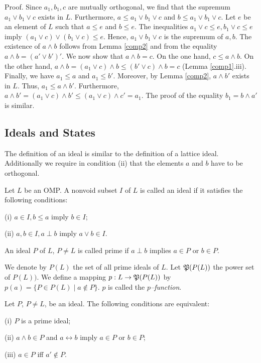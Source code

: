 Proof.
Since $a_1,b_1,c$ are mutually orthogonal, we find that the
supremum $a_1 \vee b_1 \vee c$ exists in $L$.
Furthermore, $a \le a_1 \vee b_1 \vee c$ and $b \le a_1 \vee b_1 \vee
c$. Let $e$ be an element of $L$ such that $a \le e$ and $b \le e$.
The inequalities $a_1 \vee c \le e, b_1 \vee c\le e$ imply
$(a_1 \vee c) \vee (b_1 \vee c) \le e$.
Hence, $a_1 \vee b_1 \vee c$ is the supremum of $a,b$.
The existence of $a \wedge b$ follows from
Lemma \ref{comp2} and from the equality
$a \wedge b = (a' \vee b')'$.
We now show that $a \wedge b = c$.
On the one hand, $c \le a \wedge b$.
On the other hand, $a \wedge b = (a_1 \vee c) \wedge b \le
(b' \vee c) \wedge b = c$ (Lemma \ref{comp1}.iii).
Finally, we have $a_1 \le a$ and $a_1 \le b'$.
Moreover, by Lemma \ref{comp2}, $a \wedge b'$ exists in $L$.
Thus, $a_1 \le a \wedge b'$.
Furthermore, $a \wedge b' = (a_1 \vee c) \wedge b' \le
(a_1 \vee c) \wedge c' = a_1$.
The proof of the equality $b_1 = b \wedge a'$ is similar.



\subsection{Ideals and States}

The definition of an ideal is similar to the definition of a
lattice ideal.
Additionally we require in condition (ii) that the elements $a$ and $b$
have to be orthogonal.

\begin{defin}
\label{ideal}
Let $L$ be an OMP. A nonvoid subset $I$ of $L$ is called an ideal if it
satisfies the following conditions:

(i) $a \in I, b \le a$ imply $b \in I$;

(ii) $a,b \in  I, a \perp b$ imply $a \vee b \in I$.
\end{defin}

\begin{defin}
\label{primeideal}
An ideal $P$ of $L$, $P \neq L$ is called prime if $a \perp b$ implies
$a \in P$ or $b \in P$.
\end{defin}

We denote by $P(L)$ the set of all prime ideals of $L$.
Let ${\frak P}(P(L))$ the power set of $P(L))$.
We define a mapping $p:L \rightarrow {\frak P}(P(L))$ by
$p(a) = \{ P \in P(L)\mid a \not\in P\}$.
$p$ is called the {\em $p$--function}.

\begin{lemma}
\label{prime1}
Let $P$, $P \neq L$, be an ideal.
The following conditions are equivalent:

(i) $P$ is a prime ideal;

(ii) $a \wedge b \in P$ and $a \leftrightarrow b$ imply $a \in P$
or $b \in P$;

(iii) $a \in P$ iff $a' \not\in P$.
\end{lemma}


